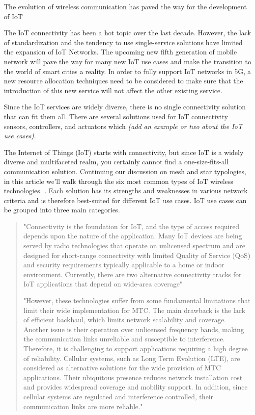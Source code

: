 \documentclass[conference]{IEEEtran}
\begin{document}
The evolution of wireless communication has paved the way for the development of IoT 

The IoT connectivity has been a hot topic over the last decade. However, the lack of standardization and the tendency to use single-service solutions have limited the expansion of IoT Networks. The upcoming new fifth generation of mobile network will pave the way for many new IoT use cases and make the transition to the world of smart cities a reality. In order to fully support IoT networks in 5G, a new resource allocation techniques need to be considered to make sure that the introduction of this new service will not affect the other existing service.


Since the IoT services are widely diverse, there is no single connectivity solution that can fit them all. There are several solutions used for IoT connectivity sensors, controllers, and actuators which \emph{(add an example or two about the IoT use cases)}.


The Internet of Things (IoT) starts with connectivity, but since IoT is a widely diverse and multifaceted realm, you certainly cannot find a one-size-fits-all communication solution. Continuing our discussion on mesh and star typologies, in this article we’ll walk through the six most common types of IoT wireless technologies.
\cite{herrero2022fundamentals}.
Each solution has its strengths and weaknesses in various network criteria and is therefore best-suited for different IoT use cases.
IoT use cases can be grouped into three main categories. 


\begin{quote}
"Connectivity is the foundation for IoT, and the type of access required depends upon the
nature of the application. Many IoT devices are being served by radio technologies that
operate on unlicensed spectrum and are designed for short-range connectivity with limited
Quality of Service (QoS) and security requirements typically applicable to a home or indoor
environment. Currently, there are two alternative connectivity tracks for IoT applications
that depend on wide-area coverage"

"However, these technologies suffer from some fundamental limitations that limit their wide implementation for
MTC. The main drawback is the lack of efficient backhaul, which limits network scalability and coverage. Another issue is their operation over unlicensed frequency bands, making the communication links unreliable and susceptible to interference. Therefore, it is challenging to support applications requiring a high degree of reliability. Cellular systems, such as Long Term Evolution (LTE), are considered as alternative solutions for the wide provision of MTC applications. Their ubiquitous presence reduces network installation cost and provides widespread coverage and mobility support. In addition, since cellular systems are regulated and interference
controlled, their communication links are more reliable."

\end{quote}
\end{document}
